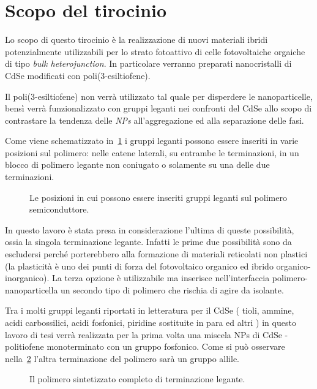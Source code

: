 \section{Scopo del tirocinio}

Lo scopo di questo tirocinio è la realizzazione di nuovi materiali ibridi potenzialmente utilizzabili per lo strato fotoattivo di celle fotovoltaiche orgaiche di tipo \emph{bulk heterojunction}. In particolare verranno preparati nanocristalli di CdSe modificati con poli(3-esiltiofene). 

Il poli(3-esiltiofene) non verrà utilizzato tal quale per disperdere le nanoparticelle, bensì verrà funzionalizzato con gruppi leganti nei confronti del CdSe allo scopo di contrastare la tendenza delle \emph{NPs} all'aggregazione ed alla separazione delle fasi.

Come viene schematizzato in~\ref{fig:leganti} i gruppi leganti possono essere inseriti in varie posizioni sul polimero: nelle catene laterali, su entrambe le terminazioni, in un blocco di polimero legante non coniugato o solamente su una delle due terminazioni.
\begin{figure}
\caption{\footnotesize{Le posizioni in cui possono essere inseriti gruppi leganti sul polimero semiconduttore.}
\label{fig:leganti}}
\end{figure}
In questo lavoro è stata presa in considerazione l'ultima di queste possibilità, ossia la singola terminazione legante. Infatti le prime due possibilità sono da escludersi perché porterebbero alla formazione di materiali reticolati non plastici (la plasticità è uno dei punti di forza del fotovoltaico organico ed ibrido organico-inorganico). La terza opzione è utilizzabile ma inserisce nell'interfaccia polimero-nanoparticella un secondo tipo di polimero che rischia di agire da isolante.

Tra i molti gruppi leganti riportati in letteratura per il CdSe ( tioli, ammine, acidi carbossilici, acidi fosfonici, piridine sostituite in para ed altri ) in questo lavoro di tesi verrà realizzata per la prima volta una miscela NPs di CdSe - politiofene monoterminato con un gruppo fosfonico. Come si può osservare nella~\ref{fig:pol-finale} l'altra terminazione del polimero sarà un gruppo allile.
\begin{figure}
\caption{\footnotesize{Il polimero sintetizzato completo di terminazione legante.}
\label{fig:pol-finale}}
\end{figure}
